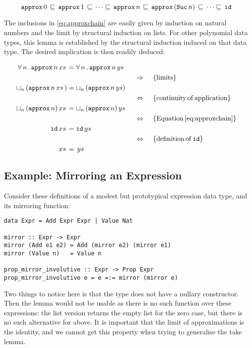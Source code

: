 \begin{equation}
\label{eq:approxchain}
\hs{approx} \, 0 \,
   \sqsubseteq \,
\hs{approx} \, 1 \,
   \sqsubseteq \,
\cdots
   \sqsubseteq \,
\hs{approx} \, n \,
   \sqsubseteq \,
\hs{approx} \, (\hs{Suc} \, n) \,
   \sqsubseteq \,
\cdots
   \sqsubseteq \,
\hs{id}
\end{equation}

The inclusions in \ref{eq:approxchain} are easily given by induction
on natural numbers and the limit by structural induction on lists.
For other polynomial data types, this lemma is established by
the structural induction induced on that data type.
The desired implication is then readily deduced:

\begin{align*}
\xsys{\fa{n} \hs{approx} \, n}{}            \\
\descra{limits}                             \\
\xsys{\lub{n} \, (\hs{approx} \, n}{)}      \\
\desclra{continuity \, of \, application}   \\
\xsys{\lub{n} \, (\hs{approx} \, n)}{}      \\
\desclra{Equation \, \ref{eq:approxchain}} \\
\xsys{\hs{id}}{}                            \\
\desclra{definition \, of \, \hs{id}}       \\
\xsys{}{}                                   \\
\end{align*}

\subsection{Example: Mirroring an Expression}

Consider these definitions of a modest but prototypical expression
data type, and its mirroring function:

\begin{verbatim}
data Expr = Add Expr Expr | Value Nat

mirror :: Expr -> Expr
mirror (Add e1 e2) = Add (mirror e2) (mirror e1)
mirror (Value n)   = Value n

prop_mirror_involutive :: Expr -> Prop Expr
prop_mirror_involutive e = e =:= mirror (mirror e)
\end{verbatim}

Two things to notice here is that the type  does not have a
nullary constructor. Then the  lemma would not be usable as
there is no such function over these expressions: the list version
returns the empty list \hs{[]} for the zero case, but there is no such
alternative for  above. It is important that the limit of
approximations is the identity, and we cannot get this property when
trying to generalise the take lemma.

